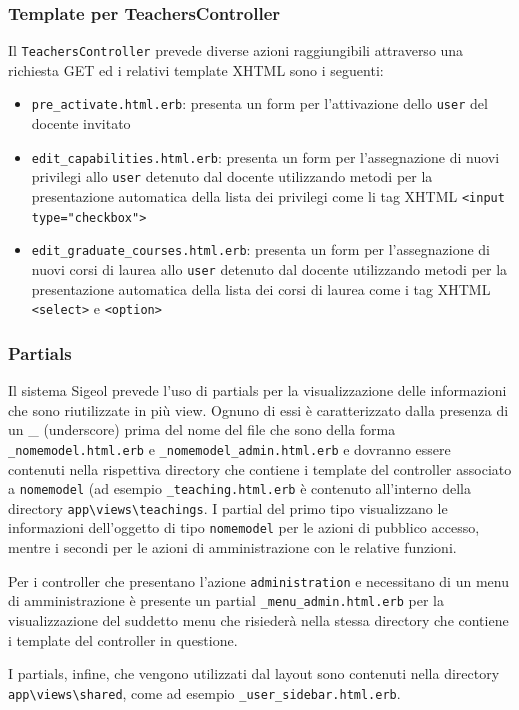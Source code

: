 \documentclass[11pt,a4paper]{article}
\begin{document}
\subsubsection*{Template per TeachersController}
Il \verb|TeachersController| prevede diverse azioni raggiungibili attraverso una richiesta GET ed i relativi template XHTML sono i seguenti:
\begin{itemize}
 \item \verb|pre_activate.html.erb|: presenta un form per l'attivazione dello \verb|user| del docente invitato
 \item \verb|edit_capabilities.html.erb|: presenta un form per l'assegnazione di nuovi privilegi allo \verb|user| detenuto dal docente utilizzando metodi per la presentazione automatica della lista dei privilegi come li tag XHTML \verb|<input type="checkbox">|
 \item \verb|edit_graduate_courses.html.erb|: presenta un form per l'assegnazione di nuovi corsi di laurea allo \verb|user| detenuto dal docente utilizzando metodi per la presentazione automatica della lista dei corsi di laurea come i tag XHTML \verb|<select>| e \verb|<option>|
\end{itemize}
\subsubsection{Partials}
Il sistema Sigeol prevede l'uso di partials per la visualizzazione delle informazioni che sono riutilizzate in più view. Ognuno di essi è caratterizzato dalla presenza di un \_ (underscore) prima del nome del file che sono della forma \verb|_nomemodel.html.erb| e \verb|_nomemodel_admin.html.erb| e dovranno essere contenuti nella rispettiva directory che contiene i template del controller associato a \verb|nomemodel| (ad esempio \verb|_teaching.html.erb| è contenuto all'interno della directory \verb|app\views\teachings|. I partial del primo tipo visualizzano le informazioni dell'oggetto di tipo \verb|nomemodel| per le azioni di pubblico accesso, mentre i secondi per le azioni di amministrazione con le relative funzioni.

Per i controller che presentano l'azione \verb|administration| e necessitano di un menu di amministrazione è presente un partial \verb|_menu_admin.html.erb| per la visualizzazione del suddetto menu che risiederà nella stessa directory che contiene i template del controller in questione.

I partials, infine, che vengono utilizzati dal layout sono contenuti nella directory \verb|app\views\shared|, come ad esempio \verb|_user_sidebar.html.erb|.
\end{document}
